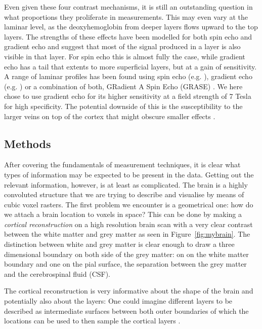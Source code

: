 Even given these four contrast mechanisms, it is still an outstanding question in what proportions they proliferate in measurements. This may even vary at the laminar level, as the deoxyhemoglobin from deeper layers flows upward to the top layers. The strengths of these effects have been modelled \cite{Uludag2009,Markuerkiaga2016} for both spin echo and gradient echo and suggest that most of the signal produced in a layer is also visible in that layer. For spin echo this is almost fully the case, while gradient echo has a tail that extents to more superficial layers, but at a gain of sensitivity. A range of laminar profiles has been found using spin echo (e.g. \cite{Zhao2004,Harel2006,Goense2006}), gradient echo (e.g. \cite{Polimeni2010,DeMartino2013,Chen2013}) or a combination of both, GRadient A Spin Echo (GRASE) \cite{Olman2012,DeMartino2013}.
We here chose to use gradient echo for its higher sensitivity at a field strength of 7 Tesla for high specificity. The potential downside of this is the susceptibility to the larger veins on top of the cortex that might obscure smaller effects \cite{Barth2007}. 

\subsection{Methods}
After covering the fundamentals of measurement techniques, it is clear what types of information may be expected to be present in the data. Getting out the relevant information, however, is at least as complicated. The brain is a highly convoluted structure that we are trying to describe and visualise by means of cubic voxel rasters. The first problem we encounter is a geometrical one: how do we attach a brain location to voxels in space? This can be done by making a \emph{cortical reconstruction} on a high resolution brain scan \cite{Dale1999,Bazin2012} with a very clear contrast between the white matter and grey matter as seen in Figure~\ref{fig:mybrain}. The distinction between white and grey matter is clear enough to draw a three dimensional boundary on both side of the grey matter: on on the white matter boundary and one on the pial surface, the separation between the grey matter and the cerebrospinal fluid (CSF).


The cortical reconstruction is very informative about the shape of the brain and potentially also about the layers: One could imagine different layers to be described as intermediate surfaces between both outer boundaries of which the locations can be used to then sample the cortical layers \cite{Koopmans2011,Polimeni2010,DeMartino2013}.

